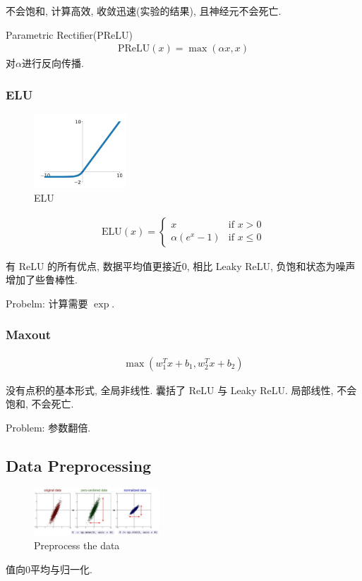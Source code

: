 不会饱和, 计算高效, 收敛迅速(实验的结果), 且神经元不会死亡. 

Parametric Rectifier(PReLU)
\begin{align*}
    \text{PReLU}(x)=\max(\alpha x, x)
\end{align*}
对$\alpha$进行反向传播. 

\subsubsection{ELU}
\begin{figure}[!htb]
    \centering
    \includegraphics[width=0.309\textwidth]{pic/Lec6/ELU.png}
    \caption{ELU}
\end{figure}

\begin{align*}
    \text{ELU}(x)=\left\{ \begin{array}{ll}
        x & \text{if }x>0\\
        \alpha(e^x-1)&\text{if }x\le 0
    \end{array} \right.
\end{align*}

有 ReLU 的所有优点, 数据平均值更接近0, 相比 Leaky ReLU, 负饱和状态为噪声增加了些鲁棒性. 

Probelm: 计算需要 $\exp$. 

\subsubsection{Maxout}
\begin{align*}
    \max(w_1^Tx+b_1, w_2^Tx+b_2)
\end{align*}

没有点积的基本形式, 全局非线性. 囊括了 ReLU 与 Leaky ReLU. 局部线性, 不会饱和, 不会死亡. 

Problem: 参数翻倍. 

\subsection{Data Preprocessing}
\begin{figure}[!htb]
    \centering
    \includegraphics[width=0.42\textwidth]{pic/Lec6/Preprocess the data}
    \caption{Preprocess the data}
\end{figure}
值向0平均与归一化. 

